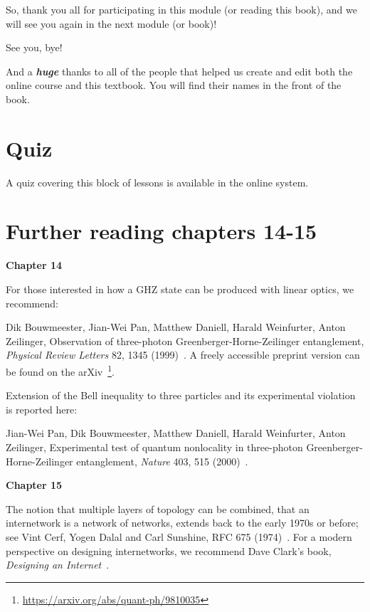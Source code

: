 So, thank you all for participating in this module (or reading this book), and we will see you again in the next module (or book)!

\mmm See you, bye!

And a \textbf{\emph{huge}} thanks to all of the people that helped us create and edit both the online course and this textbook. You will find their names in the front of the book.



\newpage
\section*{Quiz}

A quiz covering this block of lessons is available in the online system.


\section*{Further reading chapters 14-15}

{\bf Chapter 14}

For those interested in how a GHZ state can be produced with linear optics, we recommend:

Dik Bouwmeester, Jian-Wei Pan, Matthew Daniell, Harald Weinfurter, Anton Zeilinger, Observation of three-photon Greenberger-Horne-Zeilinger entanglement, \emph{Physical Review Letters} 82, 1345 (1999)~\cite{bouwmeester:ghz}.
A freely accessible preprint version can be found on the arXiv~\footnote{\url{https://arxiv.org/abs/quant-ph/9810035}}.

Extension of the Bell inequality to three particles and its experimental violation is reported here:

Jian-Wei Pan, Dik Bouwmeester, Matthew Daniell, Harald Weinfurter, Anton Zeilinger, Experimental test of quantum nonlocality in three-photon Greenberger-Horne-Zeilinger entanglement, \emph{Nature} 403, 515 (2000)~\cite{pan2000experimental}.


{\bf Chapter 15}

The notion that multiple layers of topology can be combined, that an internetwork is a network of networks, extends back to the early 1970s or before; see Vint Cerf, Yogen Dalal and Carl Sunshine, RFC 675 (1974)~\cite{RFC0675}.  For a modern perspective on designing internetworks, we recommend Dave Clark's book, \emph{Designing an Internet}~\cite{clark2018designing}.

